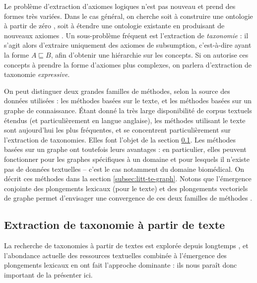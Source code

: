 Le problème d'extraction d'axiomes logiques n'est pas nouveau et prend des formes très variées. Dans le cas général, on cherche soit à construire une ontologie à partir de zéro \cite{lehmann2009dl, joinmerge, petrucci2018expressive, sritha2016survey, volker2011statistical}, soit à étendre une ontologie existante en produisant de nouveaux axiomes \cite{li2019ontology, faralli2017contrastmedium, wu2008automatically}. Un sous-problème fréquent est l'extraction de \textit{taxonomie} \cite{petrucci2018expressive, nickel2018learning, atzori2020fully, ristoski2017large}: il s'agit alors d'extraire uniquement des axiomes de subsumption, c'est-à-dire ayant la forme $A \sqsubseteq B$, afin d'obtenir une hiérarchie sur les concepts. Si on autorise ces concepts à prendre la forme d'axiomes plus complexes, on parlera d'extraction de taxonomie \textit{expressive}. 

On peut distinguer deux grandes familles de méthodes, selon la source des données utilisées : les méthodes basées sur le texte, et les méthodes basées sur un graphe de connaissance. Étant donné la très large disponibilité de corpus textuels étendus (et particulièrement en langue anglaise), les méthodes utilisant le texte sont aujourd'hui les plus fréquentes, et se concentrent particulièrement sur l'extraction de taxonomies. Elles font l'objet de la section \ref{subsec:litt-te-text}. Les méthodes basées sur un graphe ont toutefois leurs avantages : en particulier, elles peuvent fonctionner pour les graphes spécifiques à un domaine et pour lesquels il n'existe pas de données textuelles – c'est le cas notamment du domaine biomédical. On décrit ces méthodes dans la section \ref{subsec:litt-te-graph}. Notons que l'émergence conjointe des plongements lexicaux (pour le texte) et des plongements vectoriels de graphe permet d'envisager une convergence de ces deux familles de méthodes \cite{nikolaev2020joint}.


\subsection{Extraction de taxonomie à partir de texte}
\label{subsec:litt-te-text}

La recherche de taxonomies à partir de textes est explorée depuis longtemps \cite{hearst1992automatic}, et l'abondance actuelle des ressources textuelles \cite{gigaword2012, smith2013dirt} combinée à l'émergence des plongements lexicaux en ont fait l'approche dominante : ils nous paraît donc important de la présenter ici.

